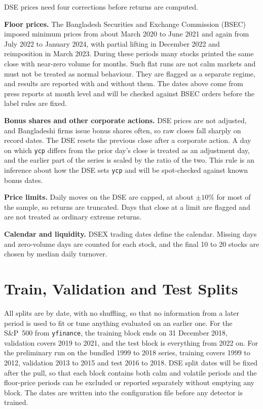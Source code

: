 DSE prices need four corrections before returns are computed.

\textbf{Floor prices.} The Bangladesh Securities and Exchange Commission (BSEC) imposed
minimum prices from about March 2020 to June 2021 and again from July 2022 to January 2024,
with partial lifting in December 2022 and reimposition in March 2023. During these periods
many stocks printed the same close with near-zero volume for months. Such flat runs are not
calm markets and must not be treated as normal behaviour. They are flagged as a separate
regime, and results are reported with and without them. The dates above come from press
reports at month level and will be checked against BSEC orders before the label rules are
fixed.

\textbf{Bonus shares and other corporate actions.} DSE prices are not adjusted, and
Bangladeshi firms issue bonus shares often, so raw closes fall sharply on record dates. The
DSE resets the previous close after a corporate action. A day on which \texttt{ycp} differs
from the prior day's close is treated as an adjustment day, and the earlier part of the
series is scaled by the ratio of the two. This rule is an inference about how the DSE sets
\texttt{ycp} and will be spot-checked against known bonus dates.

\textbf{Price limits.} Daily moves on the DSE are capped, at about $\pm 10\%$ for most of
the sample, so returns are truncated. Days that close at a limit are flagged and are not
treated as ordinary extreme returns.

\textbf{Calendar and liquidity.} DSEX trading dates define the calendar. Missing days and
zero-volume days are counted for each stock, and the final 10 to 20 stocks are chosen by
median daily turnover.

\section{Train, Validation and Test Splits}
All splits are by date, with no shuffling, so that no information from a later period is
used to fit or tune anything evaluated on an earlier one. For the S\&P~500 from
\texttt{yfinance}, the training block ends on 31 December 2018, validation covers 2019 to
2021, and the test block is everything from 2022 on. For the preliminary run on the bundled
1999 to 2018 series, training covers 1999 to 2012, validation 2013 to 2015 and test 2016 to
2018. DSE split dates will be fixed after the pull, so that each block contains both
calm and volatile periods and the floor-price periods can be excluded or reported
separately without emptying any block. The dates are written into the configuration file
before any detector is trained.

